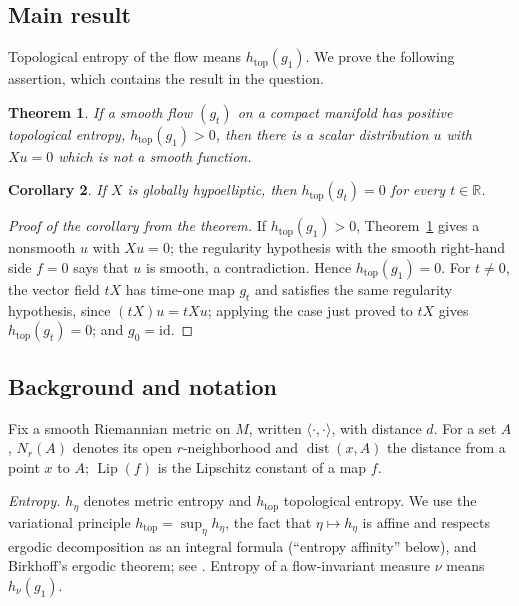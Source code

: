\documentclass[11pt]{article}
\newtheorem{theorem}{Theorem}[section]
\newtheorem{corollary}[theorem]{Corollary}
\theoremstyle{remark}
\newcommand{\R}{\mathbb R}
\newcommand{\htop}{h_{\mathrm{top}}}
\newcommand{\dist}{\operatorname{dist}}
\newcommand{\Lip}{\operatorname{Lip}}
\begin{document}
\subsection{Main result}

Topological entropy of the flow means \(\htop(g_1)\).
We prove the following assertion, which contains the result in the
question.

\begin{theorem}\label{thm:obstruction}
If a smooth flow \((g_t)\) on a compact manifold has positive
topological entropy, \(\htop(g_1)>0\), then there is a scalar
distribution \(u\) with \(Xu=0\) which is not a smooth function.
\end{theorem}

\begin{corollary}\label{cor:answer}
If \(X\) is globally hypoelliptic, then \(\htop(g_t)=0\) for every
\(t\in\R\).
\end{corollary}

\begin{proof}[Proof of the corollary from the theorem]
If \(\htop(g_1)>0\), Theorem~\ref{thm:obstruction} gives a nonsmooth
\(u\) with \(Xu=0\); the regularity hypothesis with the smooth
right-hand side \(f=0\) says that \(u\) is smooth, a contradiction.
Hence \(\htop(g_1)=0\).
For \(t\ne0\), the vector field \(tX\) has time-one map \(g_t\) and
satisfies the same regularity hypothesis, since \((tX)u=tXu\); applying
the case just proved to \(tX\) gives \(\htop(g_t)=0\); and
\(g_0=\mathrm{id}\).
\end{proof}

\subsection{Background and notation}
\label{sec:background}

Fix a smooth Riemannian metric on \(M\), written
\(\langle\cdot,\cdot\rangle\), with distance \(d\).  For a set
\(A\), \(N_r(A)\) denotes its open \(r\)-neighborhood and
\(\dist(x,A)\) the distance from a point \(x\) to \(A\);
\(\Lip(f)\) is the Lipschitz constant of a map \(f\).

\emph{Entropy.}  \(h_\eta\) denotes metric entropy and \(\htop\)
topological entropy.  We use the variational principle
\(\htop=\sup_\eta h_\eta\), the fact that \(\eta\mapsto h_\eta\) is
affine and respects ergodic decomposition as an integral formula
(``entropy affinity'' below),
and Birkhoff's ergodic theorem; see \cite{Walters1982}.  Entropy of a
flow-invariant measure \(\nu\) means \(h_\nu(g_1)\).
\end{document}
